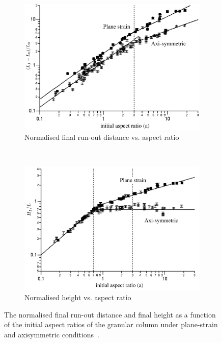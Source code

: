 \begin{figure}[tbhp]
\centering
	\begin{subfigure}[b]{0.85\textwidth}
	\centering
	\includegraphics[width=\textwidth]{Runout_Exp}
	\caption{Normalised final run-out distance vs. aspect ratio}
	\label{fig:Runout_Exp}
	\end{subfigure} \\

	\begin{subfigure}[b]{0.85\textwidth}
	\centering
	\includegraphics[width=\textwidth]{Height_Exp}
	\caption{Normalised height vs. aspect ratio}
	\label{fig:Height_Exp}
	\end{subfigure}
	\label{fig:Run_Height_Exp}
	\caption[Normalised final run-out and height as a function of initial aspect ratio for 
	plane-strain and axisymmetric collapse]{The normalised final run-out 
	distance and final height 
	as a function of the initial aspect ratios of the granular column under plane-strain 
	and axisymmetric conditions~\citep{Lajeunesse2004}.}
\end{figure}

